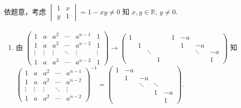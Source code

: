 	 \paragraph{} %
		 依题意，考虑 $\begin{vmatrix}
				 1 & x \\
				 y & 1
			 \end{vmatrix} = 1-xy \neq 0$ 知 $x,y \in \mathbb{R}$, $y \neq 0$.


	 \paragraph{} %
		 \begin{enumerate}
			 \item %
			       由 $\begin{pmatrix}
					       1      & a      & a^2    & \cdots & a^{n-1} & 1      \\
					       1      & a      & a^2    & \cdots & a^{n-2} & 1      \\
					       \vdots & \vdots & \vdots & \ddots & \vdots  & \vdots \\
					       1      & a      & a^2    & \cdots & a^{n-2} & 1
				       \end{pmatrix} \to \begin{pmatrix}
					       1 &   &        &   &  & 1 & -a               \\
					         & 1 &        &   &  &   & 1  & -a          \\
					         &   & \ddots &   &  &   &    & \ddots & -a \\
					         &   &        & 1 &  &   &    &        & 1
				       \end{pmatrix}$
			       知 $\begin{pmatrix}
					       1      & a      & a^2    & \cdots & a^{n-1} \\
					       1      & a      & a^2    & \cdots & a^{n-2} \\
					       \vdots & \vdots & \vdots & \ddots & \vdots  \\
					       1      & a      & a^2    & \cdots & a^{n-2}
				       \end{pmatrix}^{-1} = \begin{pmatrix}
					       1 & -a &        &        &    \\
					         & 1  & -a     &        &    \\
					         &    & \ddots & \ddots &    \\
					         &    &        & 1      & -a \\
					         &    &        &        & 1
				       \end{pmatrix}$.


\end{enumerate}
